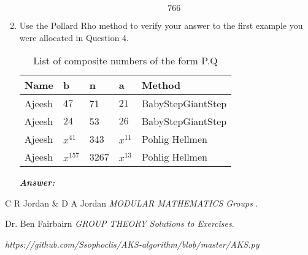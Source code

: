 \documentclass[11pt,a4paper,fleqn]{article}
\begin{document}
\begin{enumerate}[1.]
\begin{flushleft}
\begin{enumerate}
\begin{mdframed}
					\begin{dmath}\label{(10)}
						766
					\end{dmath}
				\end{mdframed}
			\end{enumerate}
		\end{flushleft}
		\item Use the Pollard Rho method to verify your answer to the first example you were allocated in Question 4. 
		
		\begin{table}[H]
			\begin{adjustbox}{scale=0.9,center}
				\begin{tabular}{ |p{2cm}|p{2cm}|p{2cm}|p{2cm}|p{4cm}| }
					\hline
					Name & b & n & a & Method \\
					\hline
					Ajeesh & $47$   & 71   & $21$   & BabyStepGiantStep \\
					Ajeesh & $24$   & 53   & $26$   & BabyStepGiantStep  \\
					Ajeesh & $x^{41}$ & 343  & $x^{11}$ & Pohlig Hellmen \\
					Ajeesh & $x^{157}$& 3267 & $x^{13}$ & Pohlig Hellmen  \\
					\hline
				\end{tabular}
			\end{adjustbox}
			\caption{List of composite numbers of the form P.Q}
			\label{table:composite-pq}
		\end{table}
		
		\begin{flushleft}
			\textbf{\textit{Answer:}}
		\end{flushleft}
	\end{enumerate}
	
	\begin{thebibliography}{unsrt}
		
		C R Jordan \& D A Jordan \emph{MODULAR MATHEMATICS Groups }.
		
		Dr. Ben Fairbairn \emph{GROUP THEORY Solutions to Exercises}.
		
		\emph{https://github.com/Ssophoclis/AKS-algorithm/blob/master/AKS.py}
		
	\end{thebibliography}
	
\end{document}

